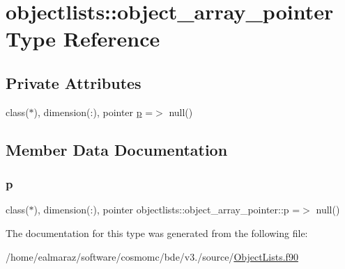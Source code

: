 \hypertarget{structobjectlists_1_1object__array__pointer}{}\section{objectlists\+:\+:object\+\_\+array\+\_\+pointer Type Reference}
\label{structobjectlists_1_1object__array__pointer}
\subsection*{Private Attributes}
\begin{DoxyCompactItemize}
\item 
class($\ast$), dimension(\+:), pointer \mbox{\hyperlink{structobjectlists_1_1object__array__pointer_a0b970f970c511543dadbe13811400b9b}{p}} =$>$ null()
\end{DoxyCompactItemize}


\subsection{Member Data Documentation}
\mbox{\label{structobjectlists_1_1object__array__pointer_a0b970f970c511543dadbe13811400b9b}} 
\subsubsection{\texorpdfstring{p}{p}}
{\footnotesize\ttfamily class($\ast$), dimension(\+:), pointer objectlists\+::object\+\_\+array\+\_\+pointer\+::p =$>$ null()\hspace{0.3cm}{\ttfamily [private]}}



The documentation for this type was generated from the following file\+:\begin{DoxyCompactItemize}
\item 
/home/ealmaraz/software/cosmomc/bde/v3./source/\mbox{\hyperlink{ObjectLists_8f90}{Object\+Lists.\+f90}}\end{DoxyCompactItemize}
